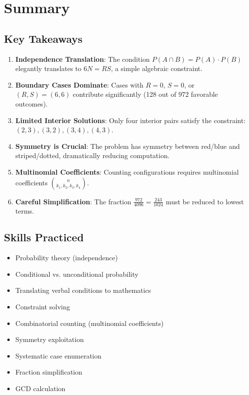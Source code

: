 \documentclass[12pt]{article}
\begin{document}
\section*{Summary}

\subsection*{Key Takeaways}

\begin{enumerate}
    \item \textbf{Independence Translation}: The condition $P(A \cap B) = P(A) \cdot P(B)$ elegantly translates to $6N = RS$, a simple algebraic constraint.
    
    \item \textbf{Boundary Cases Dominate}: Cases with $R = 0$, $S = 0$, or $(R,S) = (6,6)$ contribute significantly (128 out of 972 favorable outcomes).
    
    \item \textbf{Limited Interior Solutions}: Only four interior pairs satisfy the constraint: $(2,3), (3,2), (3,4), (4,3)$.
    
    \item \textbf{Symmetry is Crucial}: The problem has symmetry between red/blue and striped/dotted, dramatically reducing computation.
    
    \item \textbf{Multinomial Coefficients}: Counting configurations requires multinomial coefficients $\binom{n}{k_1, k_2, k_3, k_4}$.
    
    \item \textbf{Careful Simplification}: The fraction $\frac{972}{4096} = \frac{243}{1024}$ must be reduced to lowest terms.
\end{enumerate}

\subsection*{Skills Practiced}

\begin{itemize}
    \item Probability theory (independence)
    \item Conditional vs. unconditional probability
    \item Translating verbal conditions to mathematics
    \item Constraint solving
    \item Combinatorial counting (multinomial coefficients)
    \item Symmetry exploitation
    \item Systematic case enumeration
    \item Fraction simplification
    \item GCD calculation
\end{itemize}
\end{document}

